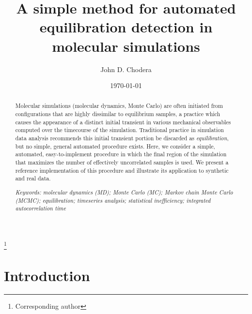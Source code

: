 \documentclass[aps,pre,twocolumn,nofootinbib,superscriptaddress,linenumbers]{revtex4-1}
\begin{document}
\title{A simple method for automated equilibration detection in molecular simulations}

\author{John D. Chodera}
 \thanks{Corresponding author}

\date{\today}

\begin{abstract}
Molecular simulations (molecular dynamics, Monte Carlo) are often initiated from configurations that are highly dissimilar to equilibrium samples, a practice which causes the appearance of a distinct initial transient in various mechanical observables computed over the timecourse of the simulation.
Traditional practice in simulation data analysis recommends this initial transient portion be discarded as \emph{equilibration}, but no simple, general automated procedure exists.
Here, we consider a simple, automated, easy-to-implement procedure in which the final region of the simulation that maximizes the number of effectively uncorrelated samples is used.
We present a reference implementation of this procedure and illustrate its application to synthetic and real data.

\emph{Keywords: molecular dynamics (MD); Monte Carlo (MC); Markov chain Monte Carlo (MCMC); equilibration; timeseries analysis; statistical inefficiency; integrated autocorrelation time}
\end{abstract}

\maketitle

\section{Introduction}
\label{section:introduction}

\end{document}
